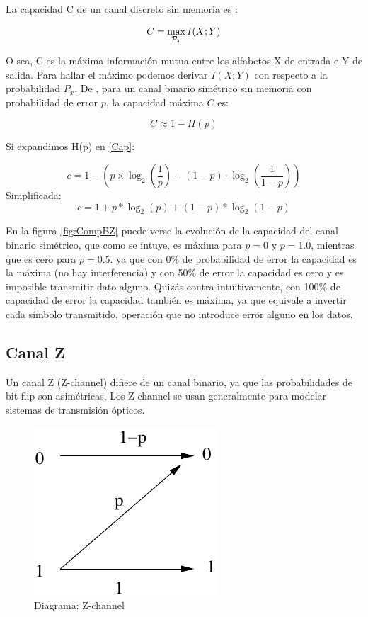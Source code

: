 La capacidad C de un canal discreto sin memoria es :

\begin{equation}
C = \max_{{\cal{P}}_x} I(X;Y) 
\end{equation}

O sea, C es la máxima información mutua entre los alfabetos X de entrada e Y de salida.
Para hallar el máximo podemos derivar $I(X;Y)$ con respecto a la probabilidad $P_x$.
De \cite{MacKay:2002}, para un canal binario simétrico sin memoria con probabilidad de error $p$, la capacidad máxima $C$ es:

\begin{equation}\label{Cap}
C \approx 1 - H(p) 
\end{equation}

Si expandimos H(p) en \ref{Cap}:

$$ c = 1-\left(p \times \log_2\left(\frac{1}{p}\right) + (1-p) \cdot \log_2\left(\frac{1}{1-p}\right)\right) $$
Simplificada:
$$ c = 1 + p * \log_2(p) + (1 - p) * \log_2(1-p) $$

En la figura \ref{fig:CompBZ} puede verse la evolución de la capacidad del canal binario simétrico, que como se intuye, es máxima para $p=0$ y $p=1.0$, mientras que es cero para $p=0.5$. ya que con 0\% de probabilidad de error la capacidad es la máxima (no hay interferencia) y con 50\% de error la capacidad es cero y es imposible transmitir dato alguno. Quizás contra-intuitivamente, con 100\% de capacidad de error la capacidad también es máxima, ya que equivale a invertir cada símbolo transmitido, operación que no introduce error alguno en los datos.


\subsection{Canal Z}
\label{canalZ}
Un canal Z (Z-channel) difiere de un canal binario, ya que las probabilidades de bit-flip son asimétricas.
Los Z-channel se usan generalmente para modelar sistemas de transmisión ópticos.

\begin{figure}[th]
  \begin{center}
    \includegraphics[scale=0.5]{capacidad/zchannel}
  \end{center}
  \caption{Diagrama: Z-channel}
  \label{fig:Gal}
\end{figure}

